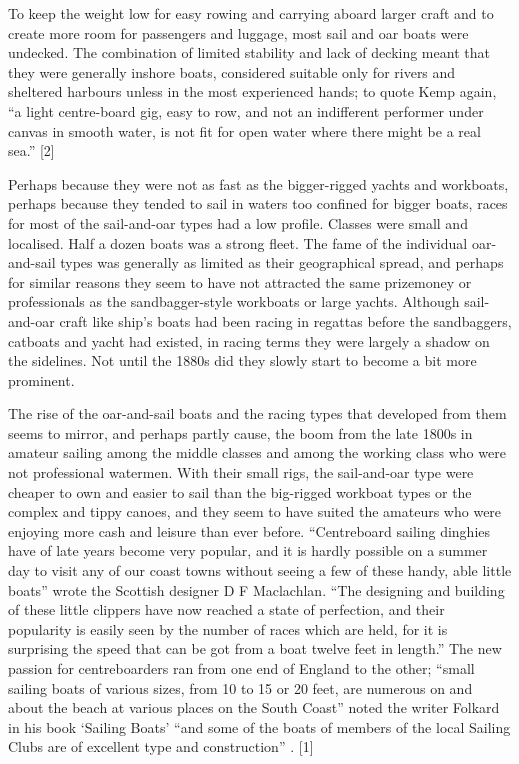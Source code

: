 \documentclass[
  letterpaper,
]{scrbook}
\begin{document}
To keep the weight low for easy rowing and carrying aboard larger craft
and to create more room for passengers and luggage, most sail and oar
boats were undecked. The combination of limited stability and lack of
decking meant that they were generally inshore boats, considered
suitable only for rivers and sheltered harbours unless in the most
experienced hands; to quote Kemp again, ``a light centre-board gig, easy
to row, and not an indifferent performer under canvas in smooth water,
is not fit for open water where there might be a real sea.'' {[}2{]}

Perhaps because they were not as fast as the bigger-rigged yachts and
workboats, perhaps because they tended to sail in waters too confined
for bigger boats, races for most of the sail-and-oar types had a low
profile. Classes were small and localised. Half a dozen boats was a
strong fleet. The fame of the individual oar-and-sail types was
generally as limited as their geographical spread, and perhaps for
similar reasons they seem to have not attracted the same prizemoney or
professionals as the sandbagger-style workboats or large yachts.
Although sail-and-oar craft like ship's boats had been racing in
regattas before the sandbaggers, catboats and yacht had existed, in
racing terms they were largely a shadow on the sidelines. Not until the
1880s did they slowly start to become a bit more prominent.

The rise of the oar-and-sail boats and the racing types that developed
from them seems to mirror, and perhaps partly cause, the boom from the
late 1800s in amateur sailing among the middle classes and among the
working class who were not professional watermen. With their small rigs,
the sail-and-oar type were cheaper to own and easier to sail than the
big-rigged workboat types or the complex and tippy canoes, and they seem
to have suited the amateurs who were enjoying more cash and leisure than
ever before. ``Centreboard sailing dinghies have of late years become
very popular, and it is hardly possible on a summer day to visit any of
our coast towns without seeing a few of these handy, able little boats''
wrote the Scottish designer D F Maclachlan. ``The designing and building
of these little clippers have now reached a state of perfection, and
their popularity is easily seen by the number of races which are held,
for it is surprising the speed that can be got from a boat twelve feet
in length.'' The new passion for centreboarders ran from one end of
England to the other; ``small sailing boats of various sizes, from 10 to
15 or 20 feet, are numerous on and about the beach at various places on
the South Coast'' noted the writer Folkard in his book `Sailing Boats'
``and some of the boats of members of the local Sailing Clubs are of
excellent type and construction'' . {[}1{]}
\end{document}
